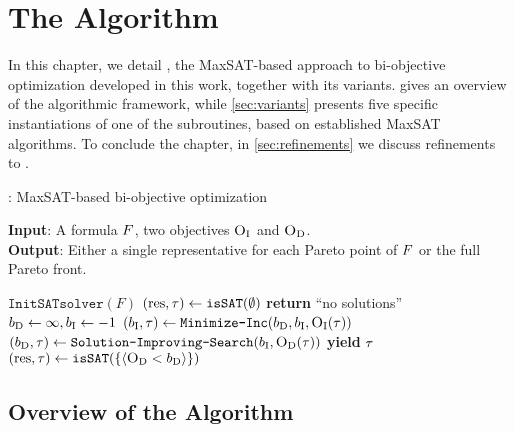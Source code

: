 \chapter{The \algname{} Algorithm\label{chap:approach}}

In this chapter, we detail \algname{}, the MaxSAT-based approach to bi-objective optimization developed in this work, together with its variants.
 gives an overview of the algorithmic framework, while \cref{sec:variants} presents five specific instantiations of one of the subroutines, based on established MaxSAT algorithms.
To conclude the chapter, in \cref{sec:refinements} we discuss refinements to \algname{}.

\begin{algorithm}[t]
  \caption{\algname{}: MaxSAT-based  bi-objective optimization} %
  \label{alg:base-algorithm}
  \textbf{Input}: A formula $F$, two objectives $\textsc{O}_{\text{I}}$ and $\textsc{O}_{\text{D}}$. \\
  \textbf{Output}: Either a single representative for each Pareto point of $F$ or the full Pareto front.

  \begin{algorithmic}[1]
    \STATE $\texttt{InitSATsolver}(F)$ \label{l:init-solv} 
    \STATE $(\text{res}, \tau) \gets \texttt{isSAT}(\emptyset)$ \quad{}\label{l:sols} 
    \IF{$\res=\unsat$}
      \STATE \textbf{return} ``no solutions''
    \ENDIF
    \STATE $b_{\text{D}} \gets \infty, b_{\text{I}} \gets -1$ \label{l:bounds}
    \WHILE{$\res = \sat$} \label{l:loopstart}
      \STATE $(b_{\text{I}}, \tau) \gets \texttt{Minimize-\allowbreak{}Inc}(b_{\text{D}} , b_{\text{I}}, \textsc{O}_{\text{I}}(\tau))$  \quad{}\label{l:minim1}
      \STATE $(b_{\text{D}}, \tau) \gets  \texttt{Solution-\allowbreak{}Improving-\allowbreak{}Search}(b_{\text{I}} , \textsc{O}_{\text{D}}(\tau))$  \quad{}\label{l:minim2}
      \STATE \textbf{yield} $\tau$  \quad{}\label{ln:stage3} 
      \STATE $(\text{res}, \tau) \gets \texttt{isSAT}(\{\langle \textsc{O}_{\text{D}} < b_{\text{D}} \rangle\})$\label{l:endL}
    \ENDWHILE
  \end{algorithmic}
\end{algorithm}

\section{Overview of the Algorithm\label{sec:algorithm}}

